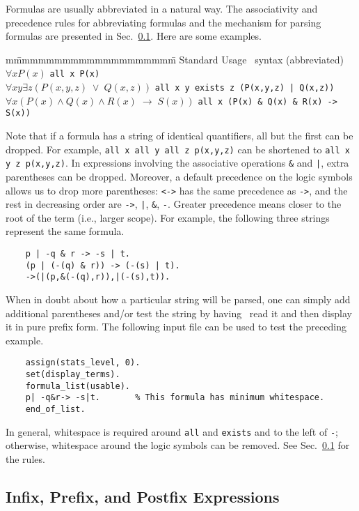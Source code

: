 \documentclass[11pt]{article}
\begin{document}
Formulas are usually abbreviated in a natural way.
The associativity and precedence rules for abbreviating
formulas and the mechanism for parsing formulas are presented in
Sec.~\ref{ops}.  Here are some examples.
{\small
\begin{tabbing}
m\=mmmmmmmmmmmmmmmmmmmm\=\kill
\>  Standard Usage \> \otter\ syntax (abbreviated) \\
\>  $\forall x P(x)$ \> \verb:all x P(x): \\
\>  $\forall x y \exists z (P(x,y,z)\;\vee\; Q(x,z))$ \>
           \verb:all x y exists z (P(x,y,z) | Q(x,z)): \\
\>  $\forall x (P(x)\wedge Q(x)\wedge R(x)\;\rightarrow\;S(x))$ \>
      \verb:all x (P(x) & Q(x) & R(x) -> S(x)):
\end{tabbing}
}
Note that if a formula has a string of identical quantifiers, all but the
first can be dropped.  For example, \verb:all x all y all z p(x,y,z):
can be shortened to \verb:all x y z p(x,y,z):.
In expressions involving the associative operations \verb:&: and \verb:|:,
extra parentheses can be dropped.
Moreover, a default precedence on the logic symbols allows
us to drop more parentheses:
\verb:<->: has the same precedence as
\verb:->:, and the rest in decreasing order are
\verb:->:,
\verb:|:,
\verb:&:,
\verb:-:.
Greater precedence means closer to the root of the term (i.e., larger scope).
For example, the following three strings represent the same formula.

{\small
\begin{verbatim}
    p | -q & r -> -s | t.
    (p | (-(q) & r)) -> (-(s) | t).
    ->(|(p,&(-(q),r)),|(-(s),t)).
\end{verbatim}
}
\noindent
When in doubt about how a particular string will be parsed, one can
simply add additional parentheses and/or test the string by having
\otter\ read it and then display it in pure prefix form.  The following
input file can be used to test the preceding example.

{\small
\begin{verbatim}
    assign(stats_level, 0).
    set(display_terms).
    formula_list(usable).
    p| -q&r-> -s|t.       % This formula has minimum whitespace.
    end_of_list.
\end{verbatim}
}
\noindent
In general, whitespace is required around \verb:all: and
\verb:exists: and to the left of \verb:-:; otherwise, whitespace
around the logic symbols can be removed.  See Sec.~\ref{ops}
for the rules.

\subsection{Infix, Prefix, and Postfix Expressions} \label{ops}
\end{document}
